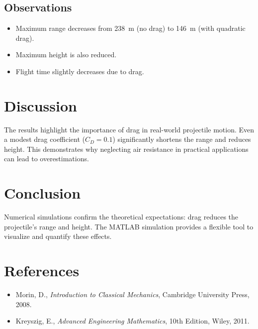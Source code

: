 \documentclass[12pt,a4paper]{article}
\begin{document}
\subsection{Observations}
\begin{itemize}
    \item Maximum range decreases from 238~m (no drag) to 146~m (with quadratic drag).
    \item Maximum height is also reduced.
    \item Flight time slightly decreases due to drag.
\end{itemize}

\section{Discussion}
The results highlight the importance of drag in real-world projectile motion. Even a modest drag coefficient ($C_D = 0.1$) significantly shortens the range and reduces height. This demonstrates why neglecting air resistance in practical applications can lead to overestimations.

\section{Conclusion}
Numerical simulations confirm the theoretical expectations: drag reduces the projectile's range and height. The MATLAB simulation provides a flexible tool to visualize and quantify these effects.

\section{References}
\begin{itemize}
    \item Morin, D., \emph{Introduction to Classical Mechanics}, Cambridge University Press, 2008.
    \item Kreyszig, E., \emph{Advanced Engineering Mathematics}, 10th Edition, Wiley, 2011.
\end{itemize}
\end{document}
